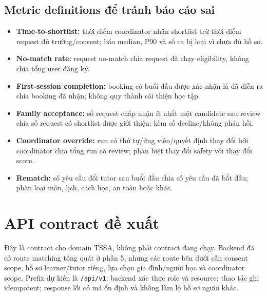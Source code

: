 \documentclass[11pt,a4paper]{article}
\begin{document}
\subsection{Metric definitions để tránh báo cáo sai}
\begin{itemize}
  \item \textbf{Time-to-shortlist:} thời điểm coordinator nhận shortlist trừ thời điểm request đủ trường/consent; báo median, P90 và số ca bị loại vì chưa đủ hồ sơ.
  \item \textbf{No-match rate:} request no-match chia request đã chạy eligibility, không chia tổng user đăng ký.
  \item \textbf{First-session completion:} booking có buổi đầu được xác nhận là đã diễn ra chia booking đã nhận; không quy thành cải thiện học tập.
  \item \textbf{Family acceptance:} số request chấp nhận ít nhất một candidate sau review chia số request có shortlist được giới thiệu; kèm số decline/không phản hồi.
  \item \textbf{Coordinator override:} run có thứ tự/ứng viên/quyết định thay đổi bởi coordinator chia tổng run có review; phân biệt thay đổi safety với thay đổi score.
  \item \textbf{Rematch:} số yêu cầu đổi tutor sau buổi đầu chia số yêu cầu đã bắt đầu; phân loại môn, lịch, cách học, an toàn hoặc khác.
\end{itemize}

\section{API contract đề xuất}

Đây là contract cho domain TSSA, không phải contract đang chạy. Backend đã có route matching tổng quát ở phần 5, nhưng các route bên dưới cần consent scope, hồ sơ learner/tutor riêng, lựa chọn gia đình/người học và coordinator scope. Prefix dự kiến là \texttt{/api/v1}; backend xác thực role và resource; thao tác ghi idempotent; response lỗi có mã ổn định và không làm lộ hồ sơ người khác.
\end{document}
